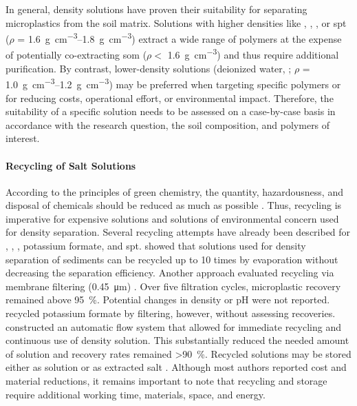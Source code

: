 In general, density solutions have proven their suitability for separating microplastics from the soil matrix. Solutions with higher densities like , , , or \ac{spt} ($\rho$ = \SIrange{1.6}{1.8}{\gram\per\cubic\centi\meter}) extract a wide range of polymers at the expense of potentially co-extracting \ac{som} ($\rho <$ \SI{1.6}{\gram\per\cubic\centi\meter}) \citep{CerliSeparation2012} and thus require additional purification. By contrast, lower-density solutions (deionized water, ; $\rho$ = \SIrange{1.0}{1.2}{\gram\per\cubic\centi\meter}) may be preferred when targeting specific polymers or for reducing costs, operational effort, or environmental impact. Therefore, the suitability of a specific solution needs to be assessed on a case-by-case basis in accordance with the research question, the soil composition, and polymers of interest.

\paragraph{Recycling of Salt Solutions}

According to the principles of green chemistry, the quantity, hazardousness, and disposal of chemicals should be reduced as much as possible \citep{AnastasGreen2009}.
Thus, recycling is imperative for expensive solutions and solutions of environmental concern used for density separation. Several recycling attempts have already been described for , , , potassium formate, and \ac{spt}.  showed that  solutions used for density separation of sediments can be recycled up to \num{10} times by evaporation without decreasing the separation efficiency. Another approach evaluated  recycling via membrane filtering (\SI{0.45}{\micro\meter}) \citep{RodriguesImproving2020}. Over five filtration cycles, microplastic recovery remained above \SI{95}{\percent}. Potential changes in density or pH were not reported.  recycled potassium formate by filtering, however, without assessing recoveries.  constructed an automatic flow system that allowed for immediate recycling and continuous use of density solution.
This substantially reduced the needed amount of  solution and recovery rates remained \SI{>90}{\percent}. Recycled solutions may be stored either as solution \citep{LiuMethod2019,RodriguesImproving2020} or as extracted salt \citep{KedzierskiEfficient2017}. Although most authors reported cost and material reductions, it remains important to note that recycling and storage require additional working time, materials, space, and energy.

